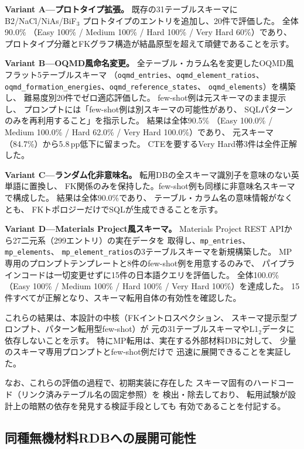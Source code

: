 \documentclass[5p,twocolumn]{elsarticle}
\begin{document}
\textbf{Variant A---プロトタイプ拡張。}
既存の31テーブルスキーマにB2/NaCl/NiAs/BiF$_3$
プロトタイプのエントリを追加し、20件で評価した。
全体90.0\%
（Easy 100\% / Medium 100\% / Hard 100\% / Very Hard 60\%）であり、
プロトタイプ分離とFKグラフ構造が結晶原型を超えて頑健であることを示す。

\textbf{Variant B---OQMD風命名変更。}
全テーブル・カラム名を変更したOQMD風フラット5テーブルスキーマ
（\texttt{oqmd\_entries}、\texttt{oqmd\_element\_ratios}、
\texttt{oqmd\_formation\_energies}、\texttt{oqmd\_reference\_states}、
\texttt{oqmd\_elements}）を構築し、
難易度別20件でゼロ適応評価した。
few-shot例は元スキーマのまま提示し、
プロンプトには「few-shot例は別スキーマの可能性があり、
SQLパターンのみを再利用すること」を指示した。
結果は全体90.5\%
（Easy 100.0\% / Medium 100.0\% / Hard 62.0\% / Very Hard 100.0\%）であり、
元スキーマ（84.7\%）から5.8\,pp低下に留まった。
CTEを要するVery Hard帯3件は全件正解した。

\textbf{Variant C---ランダム化非意味名。}
転用DBの全スキーマ識別子を意味のない英単語に置換し、
FK関係のみを保持した。few-shot例も同様に非意味名スキーマで構成した。
結果は全体90.0\%であり、
テーブル・カラム名の意味情報がなくとも、
FKトポロジーだけでSQLが生成できることを示す。

\textbf{Variant D---Materials Project風スキーマ。}
Materials Project REST APIから27二元系（299エントリ）の実在データを
取得し、\texttt{mp\_entries}、\texttt{mp\_elements}、
\texttt{mp\_element\_ratios}の3テーブルスキーマを新規構築した。
MP専用のプロンプトテンプレートと8件のfew-shot例を用意するのみで、
パイプラインコードは一切変更せずに15件の日本語クエリを評価した。
全体100.0\%
（Easy 100\% / Medium 100\% / Hard 100\% / Very Hard 100\%）を達成した。
15件すべてが正解となり、スキーマ転用自体の有効性を確認した。

これらの結果は、本設計の中核（FKイントロスペクション、
スキーマ提示型プロンプト、パターン転用型few-shot）が
元の31テーブルスキーマやL1$_2$データに依存しないことを示す。
特にMP転用は、実在する外部材料DBに対して、
少量のスキーマ専用プロンプトとfew-shot例だけで
迅速に展開できることを実証した。

なお、これらの評価の過程で、初期実装に存在した
スキーマ固有のハードコード（リンク済みテーブル名の固定参照）を
検出・除去しており、
転用試験が設計上の暗黙の依存を発見する検証手段としても
有効であることを付記する。

\subsection{同種無機材料RDBへの展開可能性}
\label{sec:extensibility}
\end{document}
